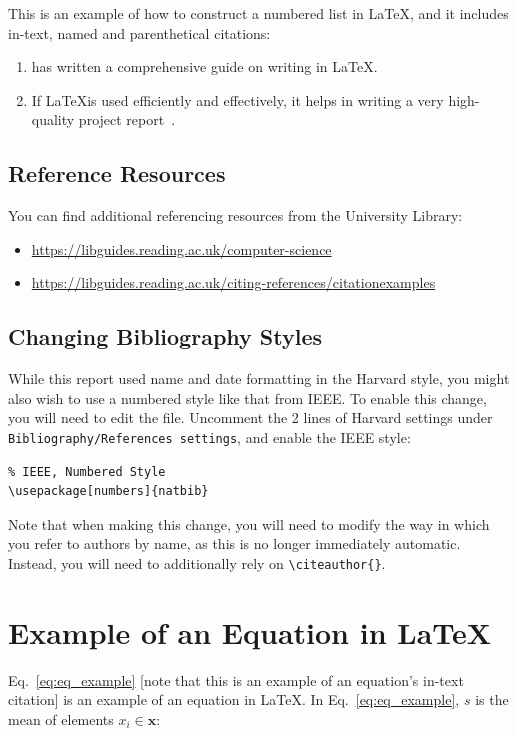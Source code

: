 \noindent 
This is an example of how to construct a numbered list in \LaTeX, and it includes in-text, named and parenthetical citations:
\begin{enumerate}
    \item \cite{kottwitzlatex2021} has written a comprehensive guide on writing in \LaTeX.
    \item If \LaTeX is used efficiently and effectively, it helps in writing a very high-quality project report~\citep{lamport1994latex}.   
\end{enumerate}

\subsection*{Reference Resources}\label{subsec:reflinks}
You can find additional referencing resources from the University Library:
\begin{itemize}
    \item \url{https://libguides.reading.ac.uk/computer-science}
    \item \url{https://libguides.reading.ac.uk/citing-references/citationexamples}
\end{itemize}

\subsection*{Changing Bibliography Styles}
While this report used name and date formatting in the Harvard style, you might also wish to use a numbered style like that from IEEE.  To enable this change, you will need to edit the  file.  Uncomment the 2 lines of Harvard settings under \texttt{Bibliography/References settings}, and enable the IEEE style:

\begin{verbatim}
% IEEE, Numbered Style
\usepackage[numbers]{natbib}

\end{verbatim}

Note that when making this change, you will need to modify the way in which you refer to authors by name, as this is no longer immediately automatic.  Instead, you will need to additionally rely on \verb|\citeauthor{}|.


\section*{Example of an Equation in \LaTeX}
Eq.~\ref{eq:eq_example} [note that this is an example of an equation's in-text citation] is an example of an equation in \LaTeX. In Eq.~\eqref{eq:eq_example}, $ s $ is the mean of elements $ x_i \in \mathbf{x} $: 

